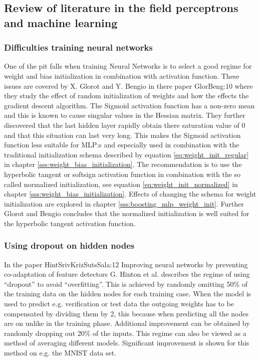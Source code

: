 \subsection{Review of literature in the field perceptrons and machine learning}


\subsubsection{Difficulties training neural networks} \label{sss:glorot_and_bengio}
One of the pit falls when training Neural Networks is to select a good regime for weight and bias initialization in combination with activation function. These issues are covered by X. Glorot and Y. Bengio in there paper \cite{art}{GlorBeng:10} where they study the effect of random initialization of weights and how the effects the gradient descent algorithm. The Sigmoid activation function has a non-zero mean and this is known to cause singular values in the Hessian matrix. They further discovered that the last hidden layer rapidly obtain there saturation value of 0 and that this situation can last very long. This makes the Sigmoid activation function less suitable for MLP:s and especially used in combination with the traditional initialization schema described by equation \ref{eq:weight_init_regular} in chapter \ref{sss:weight_bias_initialization}. The recommendation is to use the hyperbolic tangent or softsign activation function in combination with the so called normalized initialization, see equation \ref{eq:weight_init_normalized} in chapter \ref{sss:weight_bias_initialization}. Effects of changing the schema for weight initialization are explored in chapter \ref{sss:boosting_mlp_weight_init}. Further Glorot and Bengio concludes that the normalized initialization is well suited for the hyperbolic tangent activation function.    


\subsubsection{Using dropout on hidden nodes} \label{sss:using_dropout}
In the paper \cite{art}{HintSrivKrizSutsSala:12} Improving neural networks by preventing co-adaptation of feature detectors G. Hinton et al. describes the regime of using ``dropout'' to avoid ``overfitting''. This is achieved by randomly omitting 50\% of the training data on the hidden nodes for each training case. When the model is used to predict e.g. verification or test data the outgoing weights has to be compensated by dividing them by 2, this because when predicting all the nodes are on unlike in the training phase. Additional improvement can be obtained by randomly dropping out 20\% of the inputs.  
This regime can also be viewed as a method of averaging different models. Significant improvement is shown for this method on e.g. the MNIST data set. 


